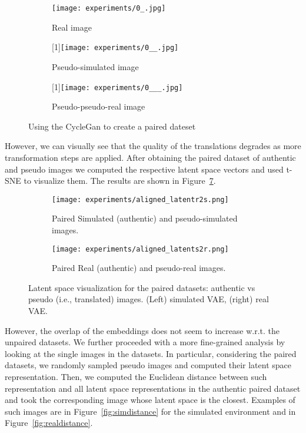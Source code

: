 \begin{figure}[h]
  \centering
  \begin{subfigure}{.33\linewidth}
	      \centering
	      \texttt{[image: experiments/0\_.jpg]}
	      \caption{Real image}\label{fig:real}
	  \end{subfigure}%
      \hfill
  \begin{subfigure}{.33\linewidth}
	      \centering
	      \scalebox{-1}[1]{\texttt{[image: experiments/0\_\_.jpg]}}
	      \caption{Pseudo-simulated image}\label{fig:psim}
	  \end{subfigure}%
  \hfill
  \begin{subfigure}{.33\linewidth}
	    \centering
	    \scalebox{-1}[1]{\texttt{[image: experiments/0\_\_\_.jpg]}}
	    \caption{Pseudo-pseudo-real image}\label{fig:ppreal}
	  \end{subfigure} 
  \caption{Using the CycleGan to create a paired dateset}
  \label{fig:examplealigned}
\end{figure}

However, we can visually see that the quality of the translations degrades as more transformation steps are applied. After obtaining the paired dataset of authentic and pseudo images we computed the respective latent space vectors and used t-SNE to visualize them. The results are shown in Figure~\ref{fig:latentpseudoaligned}.

\begin{figure}[h]
  \centering
  \begin{subfigure}{.5\linewidth}
	      \centering
	      \texttt{[image: experiments/aligned\_latentr2s.png]}
	      \caption{Paired Simulated (authentic) and pseudo-simulated images.}\label{fig:aligen_latentr2s}
	  \end{subfigure}%
      \hfill
  \begin{subfigure}{.5\linewidth}
	      \centering
	      \texttt{[image: experiments/aligned\_latents2r.png]}
	      \caption{Paired Real (authentic) and pseudo-real images.}\label{fig:aligen_latents2r}
	  \end{subfigure}
  \caption{Latent space visualization for the paired datasets: authentic vs pseudo (i.e., translated) images. (Left) simulated VAE, (right) real VAE.}
  \label{fig:latentpseudoaligned}
\end{figure}

However, the overlap of the embeddings does not seem to increase w.r.t. the unpaired datasets. We further proceeded with a more fine-grained analysis by looking at the single images in the datasets. In particular, considering the paired datasets, we randomly sampled pseudo images and computed their latent space representation. Then, we computed the Euclidean distance between such representation and all latent space representations in the authentic paired dataset and took the corresponding image whose latent space is the closest. Examples of such images are in Figure~\ref{fig:simdistance} for the simulated environment and in Figure~\ref{fig:realdistance}.

